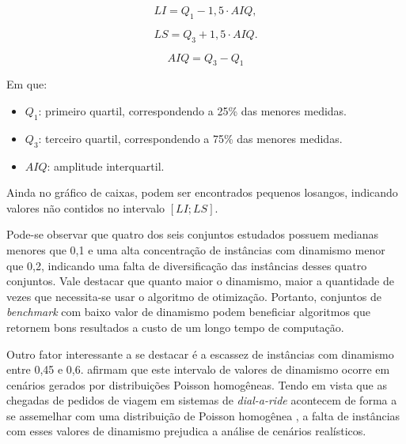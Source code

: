 \begin{equation}
  LI = Q_1 - 1{,}5 \cdot AIQ,
\end{equation}

\begin{equation}
  LS = Q_3 + 1{,}5 \cdot AIQ.
\end{equation}

\begin{equation}
  AIQ = Q_3 - Q_1
\end{equation}

Em que:
\begin{itemize}
  \item $Q_1$: primeiro quartil, correspondendo a 25\% das menores medidas.
  \item $Q_3$: terceiro quartil, correspondendo a 75\% das menores medidas.
  \item $AIQ$: amplitude interquartil.
\end{itemize}

Ainda no gráfico de caixas, podem ser encontrados pequenos losangos, indicando
valores não contidos no intervalo $[LI; LS]$.

Pode-se observar que quatro dos seis conjuntos estudados possuem medianas 
menores que 0,1 e uma alta concentração de instâncias com dinamismo menor que 
0,2, indicando uma falta de diversificação das instâncias desses quatro 
conjuntos. 
Vale destacar que quanto maior o dinamismo, maior a quantidade de vezes que
necessita-se usar o algoritmo de otimização.
Portanto, conjuntos de \textit{benchmark} com baixo valor de dinamismo podem
beneficiar algoritmos que retornem bons resultados a custo de um longo tempo de
computação.

Outro fator interessante a se destacar é a escassez de instâncias com dinamismo
entre 0,45 e 0,6. 
 afirmam que este intervalo de valores de 
dinamismo ocorre em cenários gerados por distribuições Poisson homogêneas.
Tendo em vista que as chegadas de pedidos de viagem em sistemas de 
\textit{dial-a-ride} acontecem de forma a se assemelhar com uma distribuição de
Poisson homogênea \cite{schilde_metaheuristics_2011}, a falta de instâncias 
com esses valores de dinamismo prejudica a análise de cenários realísticos.

